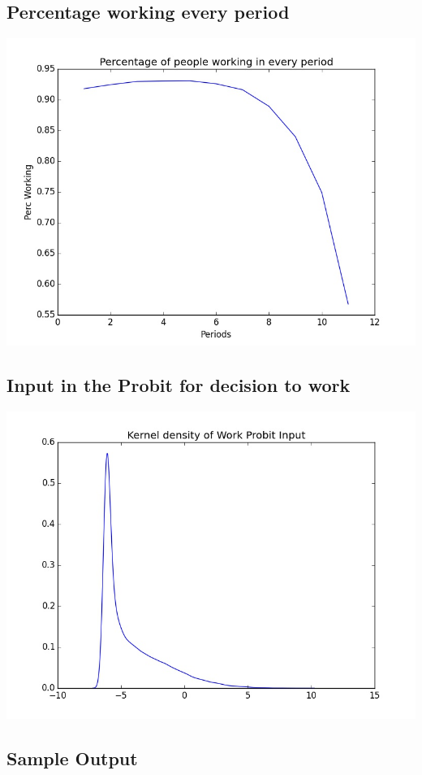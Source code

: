 \documentclass[11pt,letterpaper]{article}
\begin{document}
{		\subsection{Percentage working every period}
		\includegraphics[height=10cm,width=.9\textwidth]{perc_working_keep.jpg} \\
		\subsection{Input in the Probit for decision to work}
		\includegraphics[height=10cm,width=.9\textwidth]{KdenX_keep.jpg}
		}

\subsection{Sample Output}
\end{document}
